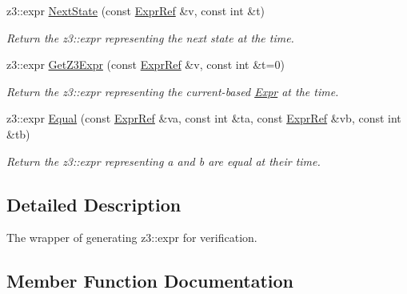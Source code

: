 \begin{DoxyCompactItemize}
\mbox{\label{classilang_1_1_ila_z3_unroller_aa9bc9bc005734178f18532fa50b26a4c}} 
z3\+::expr \mbox{\hyperlink{classilang_1_1_ila_z3_unroller_aa9bc9bc005734178f18532fa50b26a4c}{Next\+State}} (const \mbox{\hyperlink{classilang_1_1_expr_ref}{Expr\+Ref}} \&v, const int \&t)
\begin{DoxyCompactList}\small\item\em Return the z3\+::expr representing the next state at the time. \end{DoxyCompactList}\item 
\mbox{\label{classilang_1_1_ila_z3_unroller_a1c25e47c32bb83762be98466520a6e3c}} 
z3\+::expr \mbox{\hyperlink{classilang_1_1_ila_z3_unroller_a1c25e47c32bb83762be98466520a6e3c}{Get\+Z3\+Expr}} (const \mbox{\hyperlink{classilang_1_1_expr_ref}{Expr\+Ref}} \&v, const int \&t=0)
\begin{DoxyCompactList}\small\item\em Return the z3\+::expr representing the current-\/based \mbox{\hyperlink{classilang_1_1_expr}{Expr}} at the time. \end{DoxyCompactList}\item 
\mbox{\label{classilang_1_1_ila_z3_unroller_a502745b2eb8c2debbdd437dac0393145}} 
z3\+::expr \mbox{\hyperlink{classilang_1_1_ila_z3_unroller_a502745b2eb8c2debbdd437dac0393145}{Equal}} (const \mbox{\hyperlink{classilang_1_1_expr_ref}{Expr\+Ref}} \&va, const int \&ta, const \mbox{\hyperlink{classilang_1_1_expr_ref}{Expr\+Ref}} \&vb, const int \&tb)
\begin{DoxyCompactList}\small\item\em Return the z3\+::expr representing a and b are equal at their time. \end{DoxyCompactList}\end{DoxyCompactItemize}


\subsection{Detailed Description}
The wrapper of generating z3\+::expr for verification. 

\subsection{Member Function Documentation}
\mbox{\label{classilang_1_1_ila_z3_unroller_a4cdac1e3cade637c63d80a4ff9a12fba}} 
